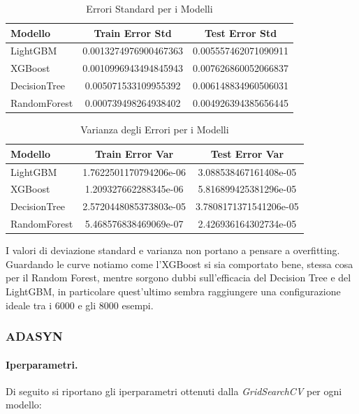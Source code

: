 \begin{table}[H]
    \centering
    \begin{tabular}{lcc}
    \toprule
    \textbf{Modello} & \textbf{Train Error Std} & \textbf{Test Error Std} \\
    \midrule
    LightGBM & 0.0013274976900467363 & 0.005557462071090911 \\
    XGBoost & 0.0010996943494845943 & 0.007626860052066837 \\
    DecisionTree & 0.005071533109955392 & 0.006148834960506031 \\
    RandomForest & 0.000739498264938402 & 0.004926394385656445 \\
    \bottomrule
    \end{tabular}
    \caption{Errori Standard per i Modelli}
\end{table}

\begin{table}[H]
    \centering
    \begin{tabular}{lcc}
    \toprule
    \textbf{Modello} & \textbf{Train Error Var} & \textbf{Test Error Var} \\
    \midrule
    LightGBM & 1.7622501170794206e-06 & 3.088538467161408e-05 \\
    XGBoost & 1.209327662288345e-06 & 5.816899425381296e-05 \\
    DecisionTree & 2.5720448085373803e-05 & 3.7808171371541206e-05 \\
    RandomForest & 5.468576838469069e-07 & 2.426936164302734e-05 \\
    \bottomrule
    \end{tabular}
    \caption{Varianza degli Errori per i Modelli}
\end{table}
\noindent I valori di deviazione standard e varianza non portano a pensare a overfitting. Guardando le curve notiamo come l'XGBoost si sia comportato bene, stessa cosa per il Random Forest, mentre sorgono dubbi sull'efficacia del Decision Tree e del LightGBM, in particolare quest'ultimo sembra raggiungere una configurazione ideale tra i 6000 e gli 8000 esempi.

\subsubsection{ADASYN}
\paragraph{Iperparametri.} Di seguito si riportano gli iperparametri ottenuti dalla \textit{GridSearchCV} per ogni modello:

